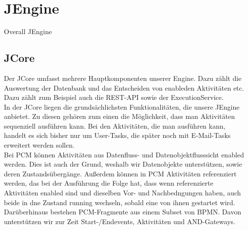 \documentclass{acm_proc_article-sp}
\begin{document}
%
%
\section{JEngine}
Overall JEngine

%
%
\subsection{JCore}
Der JCore umfasst mehrere Hauptkomponenten unserer Engine. Dazu zählt die Auswertung der Datenbank und das Entscheiden von enableden Aktivitäten etc.\\
Dazu zählt zum Beispiel auch die REST-API sowie der ExecutionService.\\
In der JCore liegen die grundsächlichsten Funktionalitäten, die unsere JEngine anbietet. Zu diesen gehören zum einen die Möglichkeit, dass man Aktivitäten sequenziell ausführen kann. Bei den Aktivitäten, die man ausführen kann, handelt es sich bisher nur um User-Tasks, die später noch mit E-Mail-Tasks erweitert werden sollen.\\
Bei PCM können Aktivitäten aus Datenfluss- und Datenobjektflusssicht enabled werden. Dies ist auch der Grund, weshalb wir Datenobjekte unterstützen, sowie deren Zustandsübergänge. Außerdem können in PCM Aktivitäten referenziert werden, das bei der Ausführung die Folge hat, dass wenn referenzierte Aktivitäten enabled sind und dieselben Vor- und Nachbedngungen haben, auch beide in dne Zustand running wechseln, sobald eine von ihnen gestartet wird.\\
Darüberhinaus bestehen PCM-Fragmente aus einem Subset von BPMN. Davon unterstützen wir zur Zeit Start-/Endevents, Aktivitäten und AND-Gateways.

%
%
\end{document}

